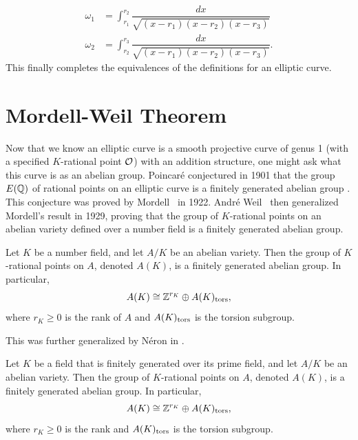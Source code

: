 	\[
	\begin{aligned}
	\omega_1&= \int_{r_1}^{r_2} \dfrac{dx}{\sqrt{(x - r_1)(x - r_2)(x - r_3)}} \\
	\omega_2&= \int_{r_2}^{r_3} \dfrac{dx}{\sqrt{(x - r_1)(x - r_2)(x - r_3)}}.
	\end{aligned}
	\]
This finally completes the equivalences of the definitions for an elliptic curve. 





\section{Mordell-Weil Theorem\label{sec:mordellweil}}

Now that we know an elliptic curve is a smooth projective curve of genus 1 (with a specified $K$-rational point $\mathcal{O}$) with an addition structure, one might ask what this curve is as an abelian group. Poincar\'e conjectured in 1901 that the group $E(\mathbb{Q})$ of rational points on an elliptic curve is a finitely generated abelian group \cite{poincare01}. This conjecture was proved by Mordell~\cite{mordell22} in 1922. Andr\'e Weil~\cite{weil29} then generalized Mordell's result in 1929, proving that the group of $K$-rational points on an abelian variety defined over a number field is a finitely generated abelian group.


\begin{thm} \label{thm:mordellweil}
Let $K$ be a number field, and let $A/K$ be an abelian variety. Then the group of $K$-rational points on $A$, denoted $A(K)$, is a finitely generated abelian group. In particular,
	\[
	A(K) \cong \mathbb{Z}^{r_K} \oplus A(K)_{\text{tors}},
	\]
where $r_K \geq 0$ is the rank of $A$ and $A(K)_{\text{tors}}$ is the torsion subgroup.
\end{thm}


This was further generalized by N\'eron in \cite{neron52}. 


\begin{thm} \label{thm:bigmordellweil}
Let $K$ be a field that is finitely generated over its prime field, and let $A/K$ be an abelian variety. Then the group of $K$-rational points on $A$, denoted $A(K)$, is a finitely generated abelian group. In particular,
	\[
	A(K) \cong \mathbb{Z}^{r_K} \oplus A(K)_{\text{tors}},
	\]
where $r_K \geq 0$ is the rank and $A(K)_{\text{tors}}$ is the torsion subgroup. 
\end{thm}


